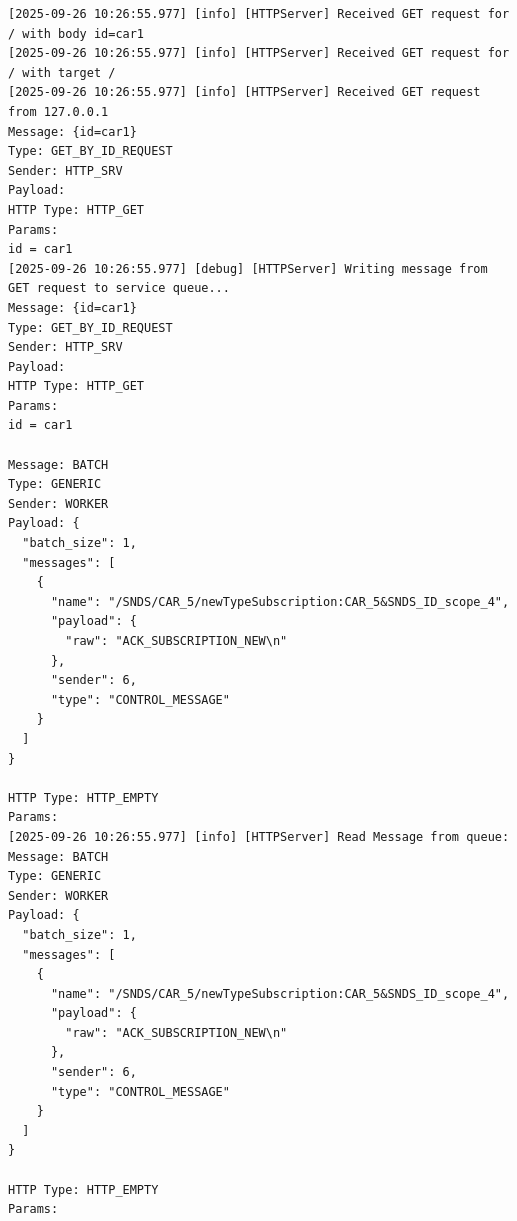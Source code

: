 \documentclass{article}
\begin{document}
\begin{lstlisting}[language=log, caption={}, label={}]
[2025-09-26 10:26:55.977] [info] [HTTPServer] Received GET request for / with body id=car1
[2025-09-26 10:26:55.977] [info] [HTTPServer] Received GET request for / with target /
[2025-09-26 10:26:55.977] [info] [HTTPServer] Received GET request from 127.0.0.1
Message: {id=car1}
Type: GET_BY_ID_REQUEST
Sender: HTTP_SRV
Payload: 
HTTP Type: HTTP_GET
Params:
id = car1
[2025-09-26 10:26:55.977] [debug] [HTTPServer] Writing message from GET request to service queue...
Message: {id=car1}
Type: GET_BY_ID_REQUEST
Sender: HTTP_SRV
Payload: 
HTTP Type: HTTP_GET
Params:
id = car1

Message: BATCH
Type: GENERIC
Sender: WORKER
Payload: {
  "batch_size": 1,
  "messages": [
    {
      "name": "/SNDS/CAR_5/newTypeSubscription:CAR_5&SNDS_ID_scope_4",
      "payload": {
        "raw": "ACK_SUBSCRIPTION_NEW\n"
      },
      "sender": 6,
      "type": "CONTROL_MESSAGE"
    }
  ]
}

HTTP Type: HTTP_EMPTY
Params:
[2025-09-26 10:26:55.977] [info] [HTTPServer] Read Message from queue:
Message: BATCH
Type: GENERIC
Sender: WORKER
Payload: {
  "batch_size": 1,
  "messages": [
    {
      "name": "/SNDS/CAR_5/newTypeSubscription:CAR_5&SNDS_ID_scope_4",
      "payload": {
        "raw": "ACK_SUBSCRIPTION_NEW\n"
      },
      "sender": 6,
      "type": "CONTROL_MESSAGE"
    }
  ]
}

HTTP Type: HTTP_EMPTY
Params:


\end{lstlisting}
\end{document}
